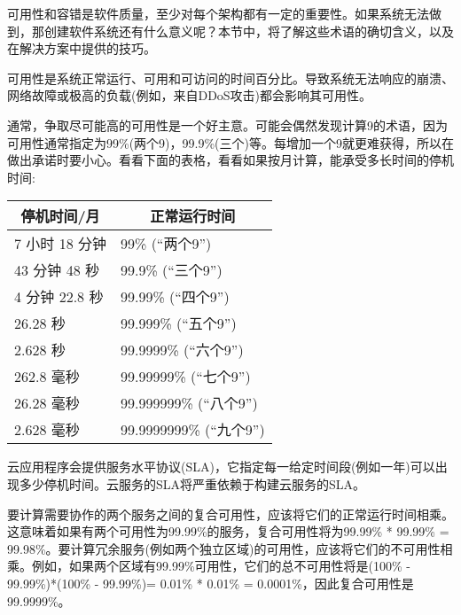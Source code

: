 
可用性和容错是软件质量，至少对每个架构都有一定的重要性。如果系统无法做到，那创建软件系统还有什么意义呢？本节中，将了解这些术语的确切含义，以及在解决方案中提供的技巧。


可用性是系统正常运行、可用和可访问的时间百分比。导致系统无法响应的崩溃、网络故障或极高的负载(例如，来自DDoS攻击)都会影响其可用性。

通常，争取尽可能高的可用性是一个好主意。可能会偶然发现计算9的术语，因为可用性通常指定为99\%(两个9)，99.9\%(三个)等。每增加一个9就更难获得，所以在做出承诺时要小心。看看下面的表格，看看如果按月计算，能承受多长时间的停机时间:

\begin{table}[H]
	\begin{tabular}{|l|l|}
		\hline
		\multicolumn{1}{|c|}{\textbf{停机时间/月}} & \multicolumn{1}{c|}{\textbf{正常运行时间}} \\ \hline
		7 小时 18 分钟                            & 99\% (“两个9”)                   \\ \hline
		43 分钟 48 秒                         & 99.9\% (“三个9”)               \\ \hline
		4 分钟 22.8 秒                        & 99.99\% (“四个9”)               \\ \hline
		26.28 秒                                 & 99.999\% (“五个9”)              \\ \hline
		2.628 秒                                 & 99.9999\% (“六个9”)              \\ \hline
		262.8 毫秒                                      & 99.99999\% (“七个9”)           \\ \hline
		26.28 毫秒                                      & 99.999999\% (“八个9”)          \\ \hline
		2.628 毫秒                                      & 99.9999999\% (“九个9”)          \\ \hline
	\end{tabular}
\end{table}

云应用程序会提供服务水平协议(SLA)，它指定每一给定时间段(例如一年)可以出现多少停机时间。云服务的SLA将严重依赖于构建云服务的SLA。

要计算需要协作的两个服务之间的复合可用性，应该将它们的正常运行时间相乘。这意味着如果有两个可用性为99.99\%的服务，复合可用性将为99.99\% * 99.99\% = 99.98\%。要计算冗余服务(例如两个独立区域)的可用性，应该将它们的不可用性相乘。例如，如果两个区域有99.99\%可用性，它们的总不可用性将是(100\% - 99.99\%)*(100\% - 99.99\%)= 0.01\% * 0.01\% = 0.0001\%，因此复合可用性是99.9999\%。


